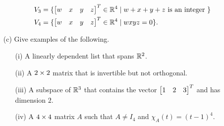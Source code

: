 \documentclass[a4paper]{article}
\begin{document}
\begin{problem}[Mock 2]
\begin{itemize}
\begin{align*}
    V_3 &= \{\left[\begin{matrix} w&x&y&z\end{matrix}\right]^T \in{\mathbb{R}}^4 \;|\; w+x+y+z \text{ is an integer }\} \\
    V_4 &= \{\left[\begin{matrix} w&x&y&z\end{matrix}\right]^T \in{\mathbb{R}}^4 \;|\; wxyz=0\}.
   \end{align*}
  \item[(c)] Give examples of the following. 
   \begin{itemize}
    \item[(i)] A linearly dependent list that spans ${\mathbb{R}}^2$.
    \item[(ii)] A $2\times 2$ matrix that is invertible but not orthogonal.
    \item[(iii)] A subspace of ${\mathbb{R}}^3$ that contains the vector
     $\left[\begin{matrix} 1&2&3\end{matrix}\right]^T$ and has dimension $2$.
    \item[(iv)] A $4\times 4$ matrix $A$ such that $A\neq I_4$ and
     $\chi_A(t)=(t-1)^4$. 
   \end{itemize}
 \end{itemize}
\end{problem}
\end{document}
